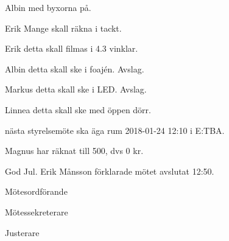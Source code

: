 \documentclass[10pt]{article}
\def\mo{Erik Månsson}
\def\ms{Johan Karlberg}
\def\ji{Edvard Carlsson}
\begin{document}
\begin{paragrafer}
\Mbaby

Albin \ypa med byxorna på.

\Mbaby

Erik \ypa Mange skall räkna i tackt.

\Mbaby

Erik \ypa detta skall filmas i 4.3 vinklar.

\Mbaby

Albin \ypa detta skall ske i foajén.
Avslag.

Markus \ypa detta skall ske i LED.
Avslag.

Linnea \ypa detta skall ske med öppen dörr.

\Mbaby

{\Mba} nästa styrelsemöte ska äga rum 2018-01-24 12:10 i E:TBA.


Magnus har räknat till 500, dvs 0 kr.

God Jul.
{\mo} förklarade mötet avslutat 12:50.

\end{paragrafer}

\hidesignfoot
\begin{signatures}{3}
\signature{\mo}{Mötesordförande}
\signature{\ms}{Mötessekreterare}
\signature{\ji}{Justerare}
\end{signatures}
\end{document}
